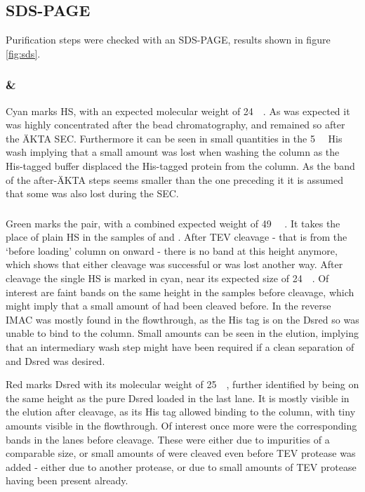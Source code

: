 \subsection{SDS\hyp{}PAGE}

Purification steps were checked with an SDS\hyp{}PAGE, results shown in figure
\ref{fig:sds}.

\subsubsection{\hs{} \& \hsmut{}}

Cyan marks HS, with an expected molecular weight of
\SI{24}{\kilo\Da}\cite{pdb}. As was expected it was highly concentrated after
the  bead chromatography, and remained so after the ÄKTA SEC.
Furthermore it can be seen in small quantities in the \SI{5}{\milli\Molar} His
wash implying that a small amount was lost when washing the column as the
His-tagged buffer displaced the His-tagged protein from the column. As the band
of the after-ÄKTA steps seems smaller than the one preceding it it is assumed
that some was also lost during the SEC.

\subsubsection{\hsdsred{}}

Green marks the \hsdsred{} pair, with a combined expected weight of
\SI{49}{\kilo\Da} \cite{pdb}. It takes the place of plain HS in the samples of
\hs{} and \hsmut{}. After TEV cleavage - that is from the `before loading'
column on onward - there is no band at this height anymore, which shows that
either cleavage was successful or \hsdsred{} was lost another way. After
cleavage the single HS is marked in cyan, near its expected size of
\SI{24}{\kilo\Da}. Of interest are faint bands on the same height in the
samples before cleavage, which might imply that a small amount of \hsdsred{}
had been cleaved before. In the reverse IMAC \hs{} was mostly found in the
flowthrough, as the His tag is on the Dsred so \hs{} was unable to bind to the
column. Small amounts can be seen in the elution, implying that an intermediary
wash step might have been required if a clean separation of \hs{} and Dsred was
desired.

Red marks Dsred with its molecular weight of \SI{25}{\kilo\Da}, further
identified by being on the same height as the pure Dsred loaded in the last
lane. It is mostly visible in the elution after cleavage, as its His tag
allowed binding to the column, with tiny amounts visible in the flowthrough. Of
interest once more were the corresponding bands in the lanes before cleavage.
These were either due to impurities of a comparable size, or small amounts of
\hsdsred were cleaved even before TEV protease was added - either due to
another protease, or due to small amounts of TEV protease having been present
already.

